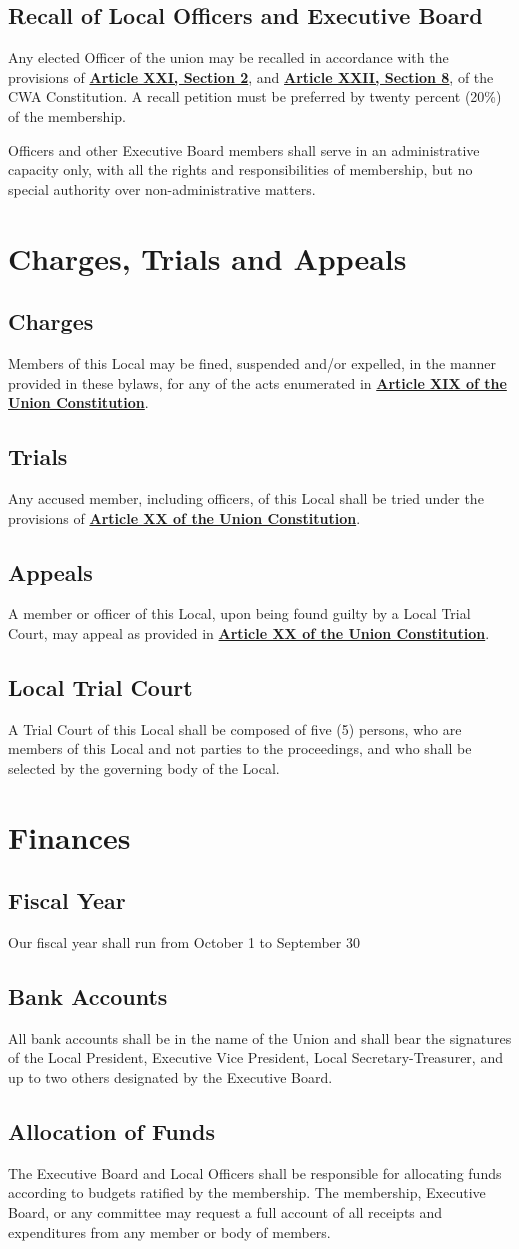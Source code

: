 \documentclass[11pt]{article}
\let\oldhref\href
\renewcommand{\href}[2]{\oldhref{#1}{\bfseries#2}}
\newcommand{\article}[1]{\vspace{.75cm}\section{#1}}
\newcommand{\articlesection}[1]{\vspace{.25cm}\subsection{#1}}
\begin{document}
\articlesection{Recall of Local Officers and Executive Board}
\begin{paralist}
  \item Any elected Officer of the union may be recalled in accordance with the provisions of \href{https://cwa-union.org/for-locals/cwa-constitution\#A21}{Article XXI, Section 2}, and \href{https://cwa-union.org/for-locals/cwa-constitution\#A22}{Article XXII, Section 8}, of the CWA Constitution. A recall petition must be preferred by twenty percent (20\%) of the membership.
  \item Officers and other Executive Board members shall serve in an administrative capacity only, with all the rights and responsibilities of membership, but no special authority over non-administrative matters.
\end{paralist}

\article{Charges, Trials and Appeals}
\articlesection{Charges}
Members of this Local may be fined, suspended and/or expelled, in the manner provided in these bylaws, for any of  the acts enumerated in \href{https://cwa-union.org/for-locals/cwa-constitution\#A19}{Article XIX of the Union Constitution}.

\articlesection{Trials}
Any accused member, including officers, of this Local shall be tried under the provisions of \href{https://cwa-union.org/for-locals/cwa-constitution\#A20}{Article XX of the Union  Constitution}.

\articlesection{Appeals}
A member or officer of this Local, upon being found guilty by a Local Trial Court, may appeal as provided in \href{https://cwa-union.org/for-locals/cwa-constitution\#A20}{Article XX of the Union Constitution}.

\articlesection{Local Trial Court}
A Trial Court of this Local shall be composed of five (5) persons, who are members of this Local and not parties to the proceedings, and who shall be selected by the governing body of the Local.

\article{Finances}
\articlesection{Fiscal Year}
Our fiscal year shall run from October 1 to September 30

\articlesection{Bank Accounts}
All bank accounts shall be in the name of the Union and shall bear the signatures of the Local President, Executive Vice President, Local Secretary-Treasurer, and up to two others designated by the Executive Board.

\articlesection{Allocation of Funds}
The Executive Board and Local Officers shall be responsible for allocating funds according to budgets ratified by the membership. The membership, Executive Board, or any committee may request a full account of all receipts and expenditures from any member or body of members.
\end{document}
